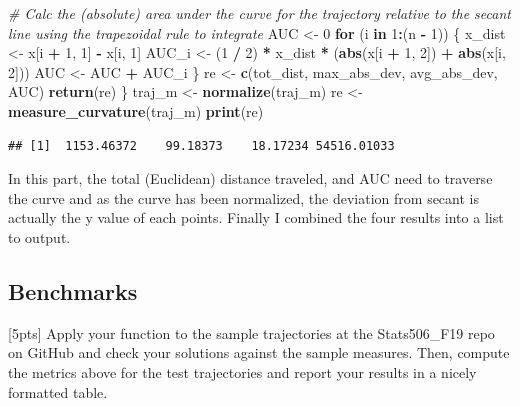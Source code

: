 \documentclass[]{article}
\newenvironment{Shaded}{\begin{snugshade}}{\end{snugshade}}
\newcommand{\CommentTok}[1]{\textcolor[rgb]{0.56,0.35,0.01}{\textit{#1}}}
\newcommand{\ControlFlowTok}[1]{\textcolor[rgb]{0.13,0.29,0.53}{\textbf{#1}}}
\newcommand{\DecValTok}[1]{\textcolor[rgb]{0.00,0.00,0.81}{#1}}
\newcommand{\KeywordTok}[1]{\textcolor[rgb]{0.13,0.29,0.53}{\textbf{#1}}}
\newcommand{\NormalTok}[1]{#1}
\newcommand{\OperatorTok}[1]{\textcolor[rgb]{0.81,0.36,0.00}{\textbf{#1}}}
\newcommand{\StringTok}[1]{\textcolor[rgb]{0.31,0.60,0.02}{#1}}
\begin{document}
\begin{Shaded}
\begin{Highlighting}[]
  \CommentTok{# Calc the (absolute) area under the curve for the trajectory relative to the secant line using the trapezoidal rule to integrate}
\NormalTok{  AUC <-}\StringTok{ }\DecValTok{0}
  \ControlFlowTok{for}\NormalTok{ (i }\ControlFlowTok{in} \DecValTok{1}\OperatorTok{:}\NormalTok{(n }\OperatorTok{-}\StringTok{ }\DecValTok{1}\NormalTok{)) \{}
\NormalTok{    x_dist <-}\StringTok{ }\NormalTok{x[i }\OperatorTok{+}\StringTok{ }\DecValTok{1}\NormalTok{, }\DecValTok{1}\NormalTok{] }\OperatorTok{-}\StringTok{ }\NormalTok{x[i, }\DecValTok{1}\NormalTok{]}
\NormalTok{    AUC_i <-}\StringTok{ }\NormalTok{(}\DecValTok{1} \OperatorTok{/}\StringTok{ }\DecValTok{2}\NormalTok{) }\OperatorTok{*}\StringTok{ }\NormalTok{x_dist }\OperatorTok{*}\StringTok{ }\NormalTok{(}\KeywordTok{abs}\NormalTok{(x[i }\OperatorTok{+}\StringTok{ }\DecValTok{1}\NormalTok{, }\DecValTok{2}\NormalTok{]) }\OperatorTok{+}\StringTok{ }\KeywordTok{abs}\NormalTok{(x[i, }\DecValTok{2}\NormalTok{]))}
\NormalTok{    AUC <-}\StringTok{ }\NormalTok{AUC }\OperatorTok{+}\StringTok{ }\NormalTok{AUC_i}
\NormalTok{  \}}
\NormalTok{  re <-}\StringTok{ }\KeywordTok{c}\NormalTok{(tot_dist, max_abs_dev, avg_abs_dev, AUC)}
  \KeywordTok{return}\NormalTok{(re)}
\NormalTok{\}}
\NormalTok{traj_m <-}\StringTok{ }\KeywordTok{normalize}\NormalTok{(traj_m)}
\NormalTok{re <-}\StringTok{ }\KeywordTok{measure_curvature}\NormalTok{(traj_m)}
\KeywordTok{print}\NormalTok{(re)}
\end{Highlighting}
\end{Shaded}

\begin{verbatim}
## [1]  1153.46372    99.18373    18.17234 54516.01033
\end{verbatim}

In this part, the total (Euclidean) distance traveled, and AUC need to
traverse the curve and as the curve has been normalized, the deviation
from secant is actually the y value of each points. Finally I combined
the four results into a list to output.

\hypertarget{benchmarks}{%
\subsection{Benchmarks}\label{benchmarks}}

{[}5pts{]} Apply your function to the sample trajectories at the
Stats506\_F19 repo on GitHub and check your solutions against the sample
measures. Then, compute the metrics above for the test trajectories and
report your results in a nicely formatted table.
\end{document}
